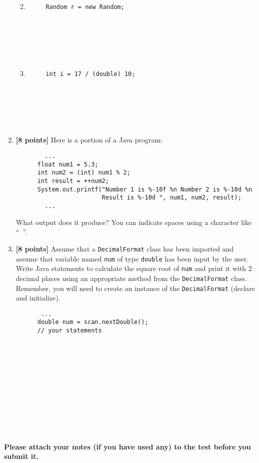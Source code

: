 \documentclass[11pt]{report}
\begin{document}
\begin{enumerate}
\begin{enumerate}
\begin{verbatim}
     
     
     
     
     
\end{verbatim}
\item \mbox{}

\begin{verbatim}
     Random r = new Random;
     
     
     
     
     
     
\end{verbatim}
\item \mbox{}

\begin{verbatim}
     int i = 17 / (double) 10;
     
     
     
     
     
     
\end{verbatim}
\end{enumerate}


\item{\bf [8 points]}
Here is a portion of a Java program:
\begin{verbatim}
        ...
      float num1 = 5.3;
      int num2 = (int) num1 % 2;
      int result = ++num2;
      System.out.printf("Number 1 is %-10f %n Number 2 is %-10d %n 
      					Result is %-10d ", num1, num2, result);
        ...
\end{verbatim}
What output does it produce? You can indicate spaces using a character like ``\verb*$ $''.

\vspace{1.2in}
\item {\bf [8 points]}
Assume that a {\tt DecimalFormat} class has been imported and assume that variable named {\tt num} of type {\tt double} has been input by the user. Write Java statements to calculate the square root of {\tt num} and print it with 2 decimal places using an appropriate method from the {\tt DecimalFormat} class. Remember, you will need to create an instance of the {\tt DecimalFormat} (declare and initialize). 
\begin{verbatim}
       ...
      double num = scan.nextDouble();
      // your statements
      
      
      
      
      
      
      
      
      
      
      
   

\end{verbatim}

\end{enumerate}


 {\bf Please attach your notes (if you have used any) to the test before you submit it.}
 
 
\end{document}
